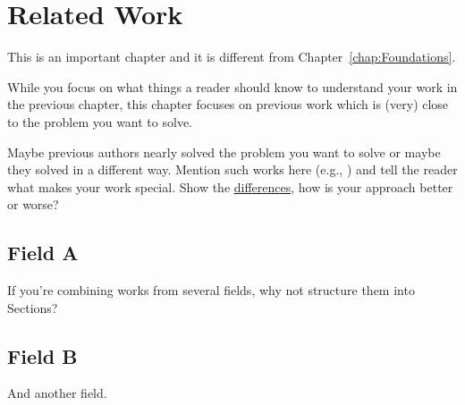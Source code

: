 \chapter{Related Work}\label{chap:relatedWork}
	This is an important chapter and it is different from Chapter~\ref{chap:Foundations}.
	
	While you focus on what things a reader should know to understand your work in the previous chapter, this chapter focuses on previous work which is (very) close to the problem you want to solve.
	
	Maybe previous authors nearly solved the problem you want to solve or maybe they solved in a different way.
	Mention such works here (e.g., \cite{Bush1945}) and tell the reader what makes your work special.
	Show the \underline{differences}, how is your approach better or worse?
	
	
	\section{Field A}
		If you're combining works from several fields, why not structure them into Sections?
	
	\section{Field B}
		And another field.
	